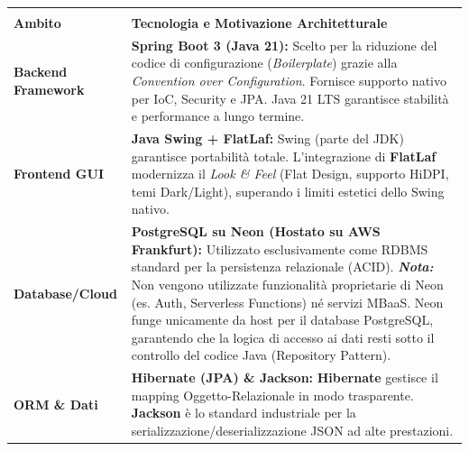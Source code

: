 \documentclass[a4paper,12pt]{article}
\begin{document}
{
\renewcommand{\arraystretch}{1.6}
\setlength{\tabcolsep}{10pt}
\begin{longtable}{|p{}|p{}|}
    
    \hline
    \rowcolor{UninaBlue} 
    \multicolumn{2}{|l|}{\textbf{\textcolor{white}{Stack Tecnologico}}} \\ 
    \hline
    \endfirsthead
    
    \hline
    \rowcolor{UninaBlue} 
    \multicolumn{2}{|l|}{\textbf{\textcolor{white}{Stack Tecnologico (continua)}}} \\ 
    \hline
    \endhead

    \rowcolor{BoxLight} 
    \textbf{Ambito} & \textbf{Tecnologia e Motivazione Architetturale} \\ 
    \hline
    
    \textbf{Backend Framework} & \textbf{Spring Boot 3 (Java 21):} Scelto per la riduzione del codice di configurazione (\textit{Boilerplate}) grazie alla \textit{Convention over Configuration}. Fornisce supporto nativo per IoC, Security e JPA. Java 21 LTS garantisce stabilità e performance a lungo termine. \\ 
    \hline
    
    \textbf{Frontend GUI} & \textbf{Java Swing + FlatLaf:} Swing (parte del JDK) garantisce portabilità totale. L'integrazione di \textbf{FlatLaf} modernizza il \textit{Look \& Feel} (Flat Design, supporto HiDPI, temi Dark/Light), superando i limiti estetici dello Swing nativo. \\ 
    \hline
    
   \textbf{Database/Cloud} & \textbf{PostgreSQL su Neon (Hostato su AWS Frankfurt):} Utilizzato esclusivamente come RDBMS standard per la persistenza relazionale (ACID). \newline \textit{\textbf{Nota:}} Non vengono utilizzate funzionalità proprietarie di Neon (es. Auth, Serverless Functions) né servizi MBaaS. Neon funge unicamente da host per il database PostgreSQL, garantendo che la logica di accesso ai dati resti sotto il controllo del codice Java (Repository Pattern). \\ 
   \hline
    
    \textbf{ORM \& Dati} & \textbf{Hibernate (JPA) \& Jackson:} \textbf{Hibernate} gestisce il mapping Oggetto-Relazionale in modo trasparente. \textbf{Jackson} è lo standard industriale per la serializzazione/deserializzazione JSON ad alte prestazioni. \\ 
    \hline
    

\end{longtable}}
\end{document}

